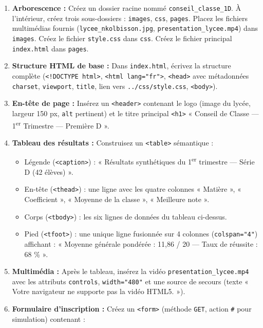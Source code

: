 \documentclass[11pt]{article}
\begin{document}
\begin{enumerate}
    \item \textbf{Arborescence :} Créez un dossier racine nommé \texttt{conseil\_classe\_1D}. À l'intérieur, créez trois sous-dossiers : \texttt{images}, \texttt{css}, \texttt{pages}. Placez les fichiers multimédias fournis (\texttt{lycee\_nkolbisson.jpg}, \texttt{presentation\_lycee.mp4}) dans \texttt{images}. Créez le fichier \texttt{style.css} dans \texttt{css}. Créez le fichier principal \texttt{index.html} dans \texttt{pages}.
    \item \textbf{Structure HTML de base :} Dans \texttt{index.html}, écrivez la structure complète (\texttt{<!DOCTYPE html>}, \texttt{<html lang="fr">}, \texttt{<head>} avec métadonnées \texttt{charset}, \texttt{viewport}, \texttt{title}, lien vers \texttt{../css/style.css}, \texttt{<body>}).
    \item \textbf{En-tête de page :} Insérez un \texttt{<header>} contenant le logo (image du lycée, largeur 150 px, \texttt{alt} pertinent) et le titre principal \texttt{<h1>} « Conseil de Classe — 1\textsuperscript{er} Trimestre — Première D ».
    \item \textbf{Tableau des résultats :} Construisez un \texttt{<table>} sémantique :
    \begin{itemize}
        \item Légende (\texttt{<caption>}) : « Résultats synthétiques du 1\textsuperscript{er} trimestre — Série D (42 élèves) ».
        \item En-tête (\texttt{<thead>}) : une ligne avec les quatre colonnes « Matière », « Coefficient », « Moyenne de la classe », « Meilleure note ».
        \item Corps (\texttt{<tbody>}) : les six lignes de données du tableau ci-dessus.
        \item Pied (\texttt{<tfoot>}) : une unique ligne fusionnée sur 4 colonnes (\texttt{colspan="4"}) affichant : « Moyenne générale pondérée : 11,86 / 20 — Taux de réussite : 68 \% ».
    \end{itemize}
    \item \textbf{Multimédia :} Après le tableau, insérez la vidéo \texttt{presentation\_lycee.mp4} avec les attributs \texttt{controls}, \texttt{width="480"} et une source de secours (texte « Votre navigateur ne supporte pas la vidéo HTML5. »).
    \item \textbf{Formulaire d'inscription :} Créez un \texttt{<form>} (méthode \texttt{GET}, action \texttt{\#} pour simulation) contenant :
    \begin{itemize}

\end{itemize}
\end{enumerate}
\end{document}
